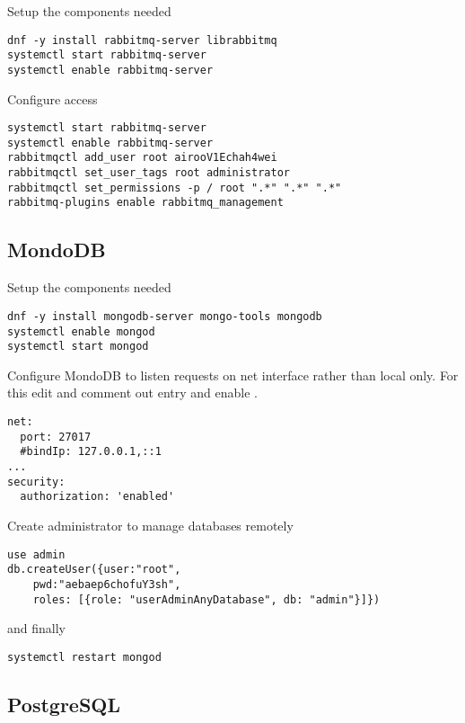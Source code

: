 Setup the components needed

\begin{lstlisting}
dnf -y install rabbitmq-server librabbitmq
systemctl start rabbitmq-server
systemctl enable rabbitmq-server
\end{lstlisting}

Configure access

\begin{lstlisting}
systemctl start rabbitmq-server
systemctl enable rabbitmq-server
rabbitmqctl add_user root airooV1Echah4wei
rabbitmqctl set_user_tags root administrator
rabbitmqctl set_permissions -p / root ".*" ".*" ".*"
rabbitmq-plugins enable rabbitmq_management
\end{lstlisting}

\subsection{MondoDB}
\label{subsec:setup-mware-mondodb}

Setup the components needed

\begin{lstlisting}
dnf -y install mongodb-server mongo-tools mongodb
systemctl enable mongod
systemctl start mongod
\end{lstlisting}

Configure MondoDB to listen requests on net interface rather
than local only. For this edit  and
comment out  entry and enable .

\begin{lstlisting}
net:
  port: 27017
  #bindIp: 127.0.0.1,::1
...
security:
  authorization: 'enabled'
\end{lstlisting}

Create administrator to manage databases remotely

\begin{lstlisting}
use admin
db.createUser({user:"root",
	pwd:"aebaep6chofuY3sh",
	roles: [{role: "userAdminAnyDatabase", db: "admin"}]})
\end{lstlisting}

and finally

\begin{lstlisting}
systemctl restart mongod
\end{lstlisting}

\subsection{PostgreSQL}
\label{subsec:setup-mware-postgresql}

